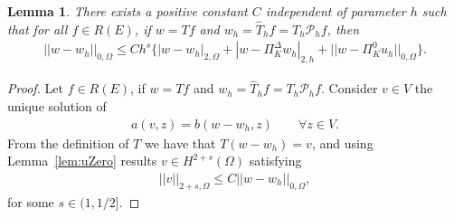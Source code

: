 \documentclass[final,reqno]{elsarticle}
\newtheorem{lemma}{Lemma}[section]
\def\O{\Omega}
\def\PiK{\Pi_{K}^{\Delta}}
\begin{document}
\begin{lemma}\label{Lem410}
There exists a positive constant $C$ independent of parameter $h$ such that for all $f\in R(E)$, if $w=Tf$ and $w_h=\widehat{T}_hf=T_h\mathcal{P}_hf$, then
\begin{align*}
||w-w_h ||_{0,\Omega}
\leq C h^s\Big\{|w-w_h|_{2,\Omega}+|w-\PiK w_h|_{2,h} +||w-\Pi_K^0 u_h ||_{0,\Omega} \Big\}.
\end{align*} 
\end{lemma}
\begin{proof}
Let $f\in R(E)$, if $w=Tf$ and $w_h=\widehat{T}_hf=T_h\mathcal{P}_hf$. Consider $v\in  V  $ the unique solution of 
\begin{align}\label{eq_Aub_NIS}
a(v,z)=b(w-w_h,z)\qquad \forall z\in   V  .
\end{align}
From the definition of $T$ we have that $T(w-w_h)=v$, and using Lemma~\ref{lem:uZero} results $v\in  H^{2+s}(\O)$ satisfying 
\begin{align}\label{reg_of_v}
||v||_{2+s,\O}\leq C||w-w_h ||_{0,\O},
\end{align}
for some $s\in (1,1/2]$.


\end{proof}
\end{document}
